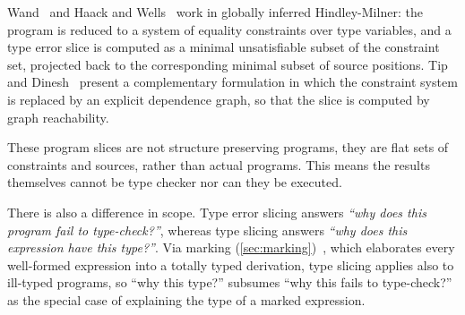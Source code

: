 Wand~\cite{Wand1986} and Haack and Wells~\cite{HaackWells2003} work in globally inferred Hindley-Milner: the program is reduced to a system of equality constraints over type variables, and a type error slice is computed as a minimal unsatisfiable subset of the constraint set, projected back to the corresponding minimal subset of source positions. Tip and Dinesh~\cite{TipDinesh2001} present a complementary formulation in which the constraint system is replaced by an explicit dependence graph, so that the slice is computed by graph reachability.

These program slices are not structure preserving programs, they are flat sets of constraints and sources, rather than actual programs. This means the results themselves cannot be type checker nor can they be executed.

There is also a difference in scope. Type error slicing answers \emph{``why does this program fail to type-check?''}, whereas type slicing answers \emph{``why does this expression have this type?''}. Via marking (\cref{sec:marking})~\cite{Marking2024}, which elaborates every well-formed expression into a totally typed derivation, type slicing applies also to ill-typed programs, so ``why this type?'' subsumes ``why this fails to type-check?'' as the special case of explaining the type of a marked expression.

\clearpage

